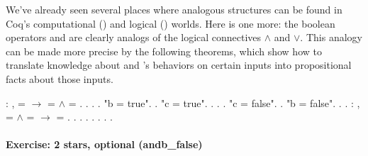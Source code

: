 \documentclass[12pt]{report}
\begin{document}
 We've already seen several places where analogous structures
    can be found in Coq's computational () and logical ()
    worlds.  Here is one more: the boolean operators  and 
    are clearly analogs of the logical connectives \ensuremath{\land} and \ensuremath{\lor}.
    This analogy can be made more precise by the following theorems,
    which show how to translate knowledge about  and 's
    behaviors on certain inputs into propositional facts about those
    inputs. \begin{coqdoccode}
\coqdocemptyline
\coqdocnoindent
{}  : \coqdockw{\ensuremath{\forall}}  ,\coqdoceol
\coqdocindent{1.00em}
   =  \ensuremath{\rightarrow}  =  \ensuremath{\land}  = .\coqdoceol
\coqdocnoindent
{}.\coqdoceol
\coqdocindent{1.00em}
   .\coqdoceol
\coqdocindent{1.00em}
 .\coqdoceol
\coqdocindent{2.00em}
 "b = true".  .\coqdoceol
\coqdocindent{3.00em}
 "c = true".  . . .\coqdoceol
\coqdocindent{3.00em}
 "c = false".  .\coqdoceol
\coqdocindent{2.00em}
 "b = false".  . .\coqdoceol
\coqdocemptyline
\coqdocnoindent
{}  : \coqdockw{\ensuremath{\forall}}  ,\coqdoceol
\coqdocindent{1.00em}
 =  \ensuremath{\land}  =  \ensuremath{\rightarrow}    = .\coqdoceol
\coqdocnoindent
{}.\coqdoceol
\coqdocindent{1.00em}
   .\coqdoceol
\coqdocindent{1.00em}
 .\coqdoceol
\coqdocindent{1.00em}
 .  . . .\coqdoceol
\coqdocemptyline
\end{coqdoccode}
\paragraph{Exercise: 2 stars, optional (andb\_false)}
\end{document}
